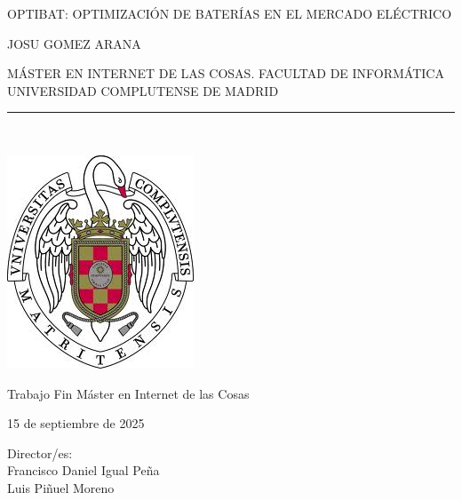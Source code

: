 \newpage

\thispagestyle{empty}

\begin{center}

  \vspace{1cm}

  {\large OPTIBAT\@: OPTIMIZACIÓN DE BATERÍAS EN EL MERCADO ELÉCTRICO}\\

  \vspace{0.5cm}

  \vspace{0.5cm}

  {\large JOSU GOMEZ ARANA}\\

  \vspace{0.5cm}

  MÁSTER EN INTERNET DE LAS COSAS\@. FACULTAD DE INFORMÁTICA\\
  UNIVERSIDAD COMPLUTENSE DE MADRID\\

  \vspace{0.65cm}

  \rule{2in}{0.5pt}\\

  \vspace{0.85cm}

  \includegraphics[height=2.5in]{figures/escudo.jpg}

  \vspace{0.5cm}

  Trabajo Fin Máster en Internet de las Cosas

  \vspace{0.5cm}

  15 de septiembre de 2025\\

  \vspace{1cm}

\end{center}

{
  \raggedleft
  Director/es:\\
  \vspace{1cm}
  Francisco Daniel Igual Peña\\
  Luis Piñuel Moreno\\
}
